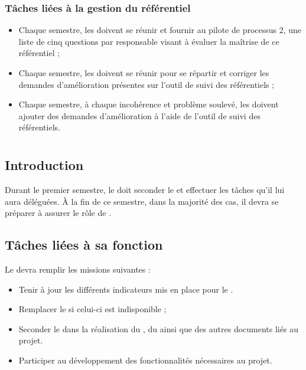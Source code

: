 \subsubsection*{Tâches liées à la gestion du référentiel}

\begin{itemize}
	\item Chaque semestre, les \RQs{} doivent se réunir et fournir au pilote de processus 2, une liste de cinq questions par responsable visant à évaluer la maîtrise de ce référentiel ;
	\item Chaque semestre, les \RQs{} doivent se réunir pour se répartir et corriger les demandes d’amélioration présentes sur l’outil de suivi des référentiels ;
	\item Chaque semestre, à chaque incohérence et problème soulevé, les \RQs{} doivent ajouter des demandes d’amélioration à l’aide de l’outil de suivi des référentiels.
\end{itemize}

\newpage
\section{\RQA}
\subsection*{Introduction}

Durant le premier semestre, le \RQA{} doit seconder le \RQ{} et effectuer les tâches qu’il lui aura déléguées. À la fin de ce semestre, dans la majorité des cas, il devra se préparer à assurer le rôle de \RQ .

\subsection*{Tâches liées à sa fonction}

Le \RQA{} devra remplir les missions suivantes :
\begin{itemize}
	\item Tenir à jour les différents indicateurs mis en place pour le \PICCourt.
	\item Remplacer le \RQA{} si celui-ci est indisponible ;
	\item Seconder le \RQ{} dans la réalisation du \PQ, du \PGC{} ainsi que des autres documents liés au projet.
        \item Participer au développement des fonctionnalités nécessaires au projet. 
\end{itemize}

